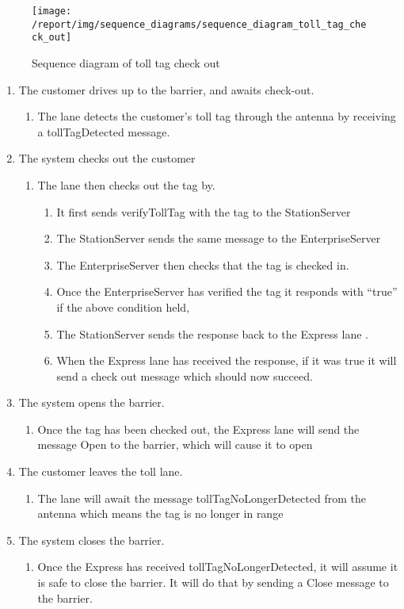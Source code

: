 \begin{figure}[H]
\texttt{[image: /report/img/sequence\_diagrams/sequence\_diagram\_toll\_tag\_check\_out]}
\caption{Sequence diagram of toll tag check out}
\label{fig:seq_check_out_toll_tag}
\end{figure}

\begin{enumerate}
\item The customer drives up to the barrier, and awaits check-out.

\begin{enumerate}
\item The lane detects the customer's toll tag through the antenna by receiving
a tollTagDetected message.
\end{enumerate}
\item The system checks out the customer

\begin{enumerate}
\item The lane then checks out the tag by. 

\begin{enumerate}
\item It first sends verifyTollTag with the tag to the StationServer
\item The StationServer sends the same message to the EnterpriseServer
\item The EnterpriseServer then checks that the tag is checked in.
\item Once the EnterpriseServer has verified the tag it responds with ``true''
if the above condition held,
\item The StationServer sends the response back to the Express lane .
\item When the Express lane has received the response, if it was true it
will send a check out message which should now succeed.
\end{enumerate}
\end{enumerate}
\item The system opens the barrier.

\begin{enumerate}
\item Once the tag has been checked out, the Express lane will send the
message Open to the barrier, which will cause it to open
\end{enumerate}
\item The customer leaves the toll lane.

\begin{enumerate}
\item The lane will await the message tollTagNoLongerDetected from the antenna
which means the tag is no longer in range
\end{enumerate}
\item The system closes the barrier.

\begin{enumerate}
\item Once the Express has received tollTagNoLongerDetected, it will assume
it is safe to close the barrier. It will do that by sending a Close
message to the barrier.\end{enumerate}
\end{enumerate}

